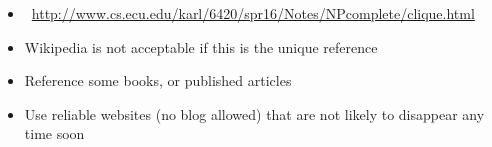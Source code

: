 \documentclass{article}
\begin{document}
\begin{itemize}\itemsep .125cm
	\item ~\url{http://www.cs.ecu.edu/karl/6420/spr16/Notes/NPcomplete/clique.html}
	\item Wikipedia is not acceptable if this is the unique reference
	\item Reference some books, or published articles
	\item Use reliable websites (no blog allowed) that are not likely to disappear any time soon
\end{itemize}

\ifx\onefile\undefined
	
\end{document}
